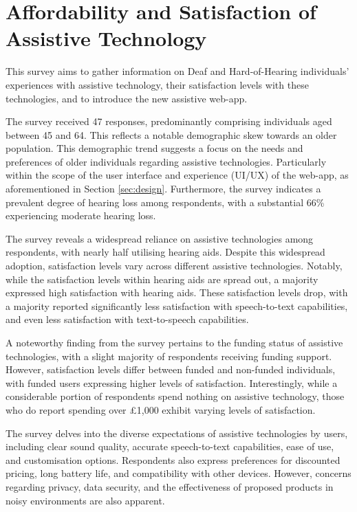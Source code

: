 \documentclass{l4proj}
\begin{document}
\section{Affordability and Satisfaction of Assistive Technology}
\label{sec:afford-survey}

This survey aims to gather information on Deaf and Hard-of-Hearing individuals' experiences with assistive technology, their satisfaction levels with these technologies, and to introduce the new assistive web-app.

The survey received 47 responses, predominantly comprising individuals aged between 45 and 64. This reflects a notable demographic skew towards an older population. This demographic trend suggests a focus on the needs and preferences of older individuals regarding assistive technologies. Particularly within the scope of the user interface and experience (UI/UX) of the web-app, as aforementioned in Section \ref{sec:design}. Furthermore, the survey indicates a prevalent degree of hearing loss among respondents, with a substantial 66\% experiencing moderate hearing loss.

The survey reveals a widespread reliance on assistive technologies among respondents, with nearly half utilising hearing aids. Despite this widespread adoption, satisfaction levels vary across different assistive technologies. Notably, while the satisfaction levels within hearing aids are spread out, a majority expressed high satisfaction with hearing aids. These satisfaction levels drop, with a majority reported significantly less satisfaction with speech-to-text capabilities, and even less satisfaction with text-to-speech capabilities.

A noteworthy finding from the survey pertains to the funding status of assistive technologies, with a slight majority of respondents receiving funding support. However, satisfaction levels differ between funded and non-funded individuals, with funded users expressing higher levels of satisfaction. Interestingly, while a considerable portion of respondents spend nothing on assistive technology, those who do report spending over £1,000 exhibit varying levels of satisfaction.

The survey delves into the diverse expectations of assistive technologies by users, including clear sound quality, accurate speech-to-text capabilities, ease of use, and customisation options. Respondents also express preferences for discounted pricing, long battery life, and compatibility with other devices. However, concerns regarding privacy, data security, and the effectiveness of proposed products in noisy environments are also apparent. 
\end{document}
